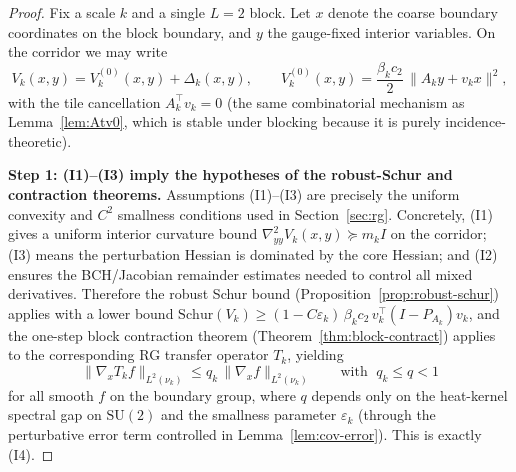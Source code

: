 \documentclass[11pt]{article}
\theoremstyle{definition}
\newcommand{\SU}{\mathrm{SU}}
\newcommand{\1}{\mathbf{1}}
\begin{document}
\begin{proof}
Fix a scale $k$ and a single $L=2$ block. Let $x$ denote the coarse boundary coordinates on the block boundary, and $y$ the gauge-fixed interior variables. On the corridor we may write
\[
V_k(x,y)=V_k^{(0)}(x,y)+\Delta_k(x,y),\qquad V_k^{(0)}(x,y)=\frac{\beta_k c_2}{2}\,\|A_k y+v_k x\|^2,
\]
with the tile cancellation $A_k^\top v_k=0$ (the same combinatorial mechanism as Lemma~\ref{lem:Atv0}, which is stable under blocking because it is purely incidence-theoretic).

\medskip
\noindent\textbf{Step 1: (I1)--(I3) imply the hypotheses of the robust-Schur and contraction theorems.}
Assumptions (I1)--(I3) are precisely the uniform convexity and $C^2$ smallness conditions used in Section~\ref{sec:rg}. Concretely, (I1) gives a uniform interior curvature bound
\(\nabla^2_{yy}V_k(x,y)\succeq m_k I\) on the corridor; (I3) means the perturbation Hessian is dominated by the core Hessian; and (I2) ensures the BCH/Jacobian remainder estimates needed to control all mixed derivatives. Therefore the robust Schur bound (Proposition~\ref{prop:robust-schur}) applies with a lower bound
\(\mathrm{Schur}(V_k)\ge (1-C\varepsilon_k)\,\beta_k c_2\,v_k^\top(I-P_{A_k})v_k\), and the one-step block contraction theorem (Theorem~\ref{thm:block-contract}) applies to the corresponding RG transfer operator $T_k$, yielding
\[
\|\nabla_x T_k f\|_{L^2(\nu_k)}\le q_k\,\|\nabla_x f\|_{L^2(\nu_k)}\qquad\text{with }\;q_k\le q<1
\]
for all smooth $f$ on the boundary group, where $q$ depends only on the heat-kernel spectral gap on $\SU(2)$ and the smallness parameter $\varepsilon_k$ (through the perturbative error term controlled in Lemma~\ref{lem:cov-error}). This is exactly (I4).


\end{proof}
\end{document}
